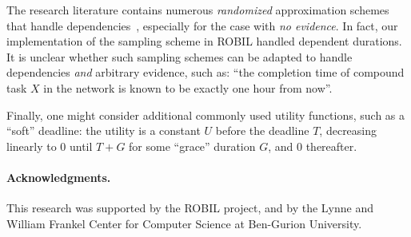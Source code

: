 \documentclass{article}
\begin{document}
The research literature contains numerous {\em randomized} approximation schemes that handle dependencies~\cite{Pearl,Yuan20061189}, especially for
the case with {\em no evidence}. In fact, our implementation of the sampling scheme in ROBIL handled dependent durations.
It is unclear whether such sampling schemes can be adapted to handle dependencies {\em and} arbitrary evidence, such as: ``the completion time of
compound task $X$ in the network is known to be exactly one hour from now''.


Finally, one might consider additional commonly used utility functions, such as a ``soft'' deadline: the utility is a constant $U$ before the deadline $T$, decreasing linearly to 0
until $T+G$ for some ``grace'' duration $G$, and 0 thereafter.
\paragraph{Acknowledgments.} This research was supported by the ROBIL project, and by the Lynne and William Frankel Center for Computer Science at Ben-Gurion University.
\small


\end{document}
